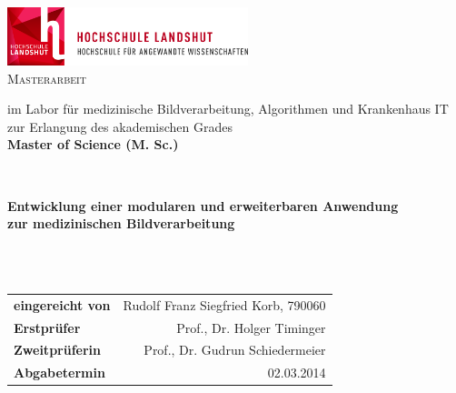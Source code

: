 \begin{titlepage}


\begin{center}



\includegraphics[angle=0,width=7cm]{./img/HL_WBM_de_B_300dpi.jpg}\\[2cm]


\textsc{\LARGE Masterarbeit}\\[0.6cm]

\small 

im Labor für medizinische Bildverarbeitung, Algorithmen und Krankenhaus IT \\[1cm]
zur Erlangung des akademischen Grades\\
\textbf{Master of Science (M. Sc.)} \\[1cm]

\normalsize

\HRule \\[0.4cm]
{
	
	\bfseries Entwicklung einer modularen und erweiterbaren Anwendung \\
	 zur medizinischen Bildverarbeitung
}\\[0.4cm]
\HRule \\[1.3cm]







\vfill

\footnotesize 

\begin{tabularx}{\textwidth}{Xr}
  \textbf{eingereicht von} 	& 	Rudolf Franz Siegfried Korb, 790060 \\ 
  \textbf{Erstprüfer} 		& 	Prof., Dr. Holger Timinger \\ 
  \textbf{Zweitprüferin} 	& 	Prof., Dr. Gudrun Schiedermeier \\ 
  \textbf{Abgabetermin}		&	02.03.2014
\end{tabularx}


\end{center}
\end{titlepage}
